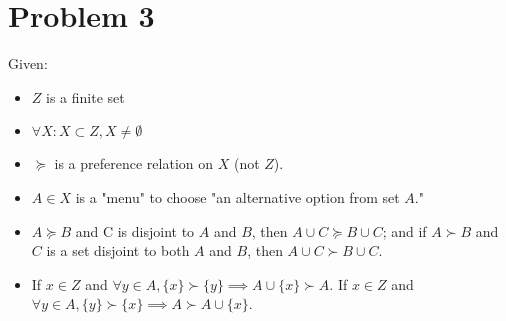 \documentclass{article}
\begin{document}
\section*{Problem 3}
Given: \begin{itemize}
    \item $Z$ is a finite set
    \item $\forall X: X\subset Z, X\neq \emptyset$
    \item $\succeq$ is a preference relation on $X$ (not $Z$). 
    \item $A\in X$ is a "menu" to choose "an alternative option from set $A$."
    \item $A\succeq B$ and C is disjoint to $A$ and $B$, then $A\cup C\succeq B\cup C$; and if $A\succ B$ and $C$ is a set disjoint to both $A$ and $B$, then $A\cup C\succ B\cup C$.
    \item If $x\in Z$ and $\forall y\in A, \{x\}\succ \{y\}\implies A\cup \{x\} \succ A$. If $x\in Z$ and $\forall y\in A, \{y\}\succ \{x\}\implies A\succ A\cup \{x\}$. 
\end{itemize}
\end{document}
